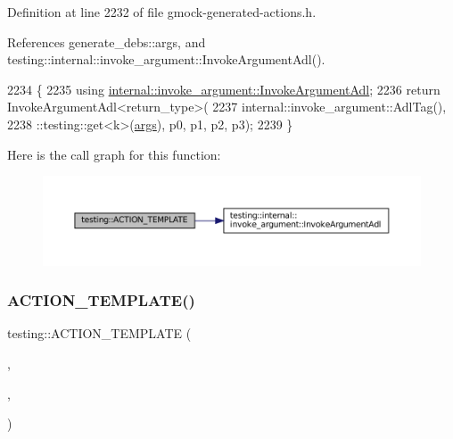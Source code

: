 Definition at line 2232 of file gmock-\/generated-\/actions.\+h.



References generate\+\_\+debs\+::args, and testing\+::internal\+::invoke\+\_\+argument\+::\+Invoke\+Argument\+Adl().


\begin{DoxyCode}
2234                                                     \{
2235   \textcolor{keyword}{using} \hyperlink{namespacetesting_1_1internal_1_1invoke__argument_abd36164191a3e386c50243074854b272}{internal::invoke\_argument::InvokeArgumentAdl};
2236   \textcolor{keywordflow}{return} InvokeArgumentAdl<return\_type>(
2237       internal::invoke\_argument::AdlTag(),
2238       ::testing::get<k>(\hyperlink{namespacegenerate__debs_a75f9143e38df82d83b2e8a6f99cae02c}{args}), p0, p1, p2, p3);
2239 \}
\end{DoxyCode}
Here is the call graph for this function\+:
\nopagebreak
\begin{figure}[H]
\begin{center}
\leavevmode
\includegraphics[width=350pt]{namespacetesting_ae98e43eecf8f44990b39b460f00b397b_cgraph}
\end{center}
\end{figure}
\mbox{\label{namespacetesting_a505f6d82df233802c5f4235d77dca164}} 
\subsubsection{\texorpdfstring{A\+C\+T\+I\+O\+N\+\_\+\+T\+E\+M\+P\+L\+A\+T\+E()}{ACTION\_TEMPLATE()}\hspace{0.1cm}{\footnotesize\ttfamily [12/28]}}
{\footnotesize\ttfamily testing\+::\+A\+C\+T\+I\+O\+N\+\_\+\+T\+E\+M\+P\+L\+A\+TE (\begin{DoxyParamCaption}\item[{Invoke\+Argument}]{,  }\item[{H\+A\+S\+\_\+1\+\_\+\+T\+E\+M\+P\+L\+A\+T\+E\+\_\+\+P\+A\+R\+A\+MS(int, k)}]{,  }\item[{A\+N\+D\+\_\+5\+\_\+\+V\+A\+L\+U\+E\+\_\+\+P\+A\+R\+A\+MS(p0, p1, p2, p3, p4)}]{ }\end{DoxyParamCaption})}



